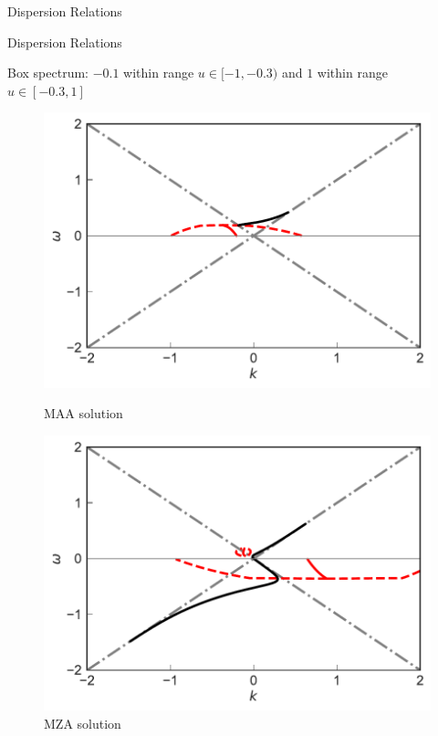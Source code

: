 \documentclass[9pt]{beamer}
\begin{document}
\begin{darkframes}
\begin{frame}{Dispersion Relations}
\end{frame}





\begin{frame}{Dispersion Relations}

 Box spectrum: $-0.1$ within range $u\in [-1,-0.3)$ and $1$ within range $u\in [-0.3,1]$

   \begin{figure}
      \includegraphics[width=\linewidth]{assets/dr/spectBoxC1MAADRPltBlob.pdf}
      \caption*{MAA solution}
      \endminipage\hfill
      \includegraphics[width=\linewidth]{assets/dr/spectBoxC1MZADRPltBlob.pdf}
      \caption*{MZA solution}
      \endminipage\hfill

\end{figure}
\end{frame}
\end{darkframes}
\end{document}
